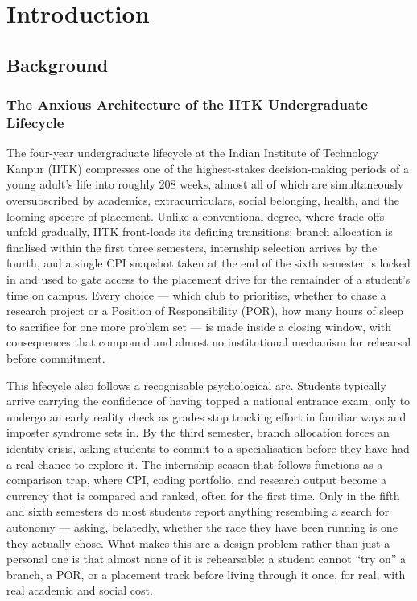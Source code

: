
\chapter{Introduction}
\label{chap:introduction}

\section{Background}
\label{sec:background}

\subsection*{The Anxious Architecture of the IITK Undergraduate Lifecycle}

The four-year undergraduate lifecycle at the Indian Institute of Technology Kanpur (IITK) compresses one of the highest-stakes decision-making periods of a young adult's life into roughly 208 weeks, almost all of which are simultaneously oversubscribed by academics, extracurriculars, social belonging, health, and the looming spectre of placement. Unlike a conventional degree, where trade-offs unfold gradually, IITK front-loads its defining transitions: branch allocation is finalised within the first three semesters, internship selection arrives by the fourth, and a single CPI snapshot taken at the end of the sixth semester is locked in and used to gate access to the placement drive for the remainder of a student's time on campus. Every choice --- which club to prioritise, whether to chase a research project or a Position of Responsibility (POR), how many hours of sleep to sacrifice for one more problem set --- is made inside a closing window, with consequences that compound and almost no institutional mechanism for rehearsal before commitment.

This lifecycle also follows a recognisable psychological arc. Students typically arrive carrying the confidence of having topped a national entrance exam, only to undergo an early reality check as grades stop tracking effort in familiar ways and imposter syndrome sets in. By the third semester, branch allocation forces an identity crisis, asking students to commit to a specialisation before they have had a real chance to explore it. The internship season that follows functions as a comparison trap, where CPI, coding portfolio, and research output become a currency that is compared and ranked, often for the first time. Only in the fifth and sixth semesters do most students report anything resembling a search for autonomy --- asking, belatedly, whether the race they have been running is one they actually chose. What makes this arc a design problem rather than just a personal one is that almost none of it is rehearsable: a student cannot ``try on'' a branch, a POR, or a placement track before living through it once, for real, with real academic and social cost.

